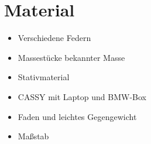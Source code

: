 \section{Material}
\begin{itemize}
    \item Verschiedene Federn
    \item Massestücke bekannter Masse
    \item Stativmaterial
    \item CASSY mit Laptop und BMW-Box
    \item Faden und leichtes Gegengewicht
    \item Maßstab
\end{itemize}
\begin{figure}[H]
\centering
{}

\end{figure}
